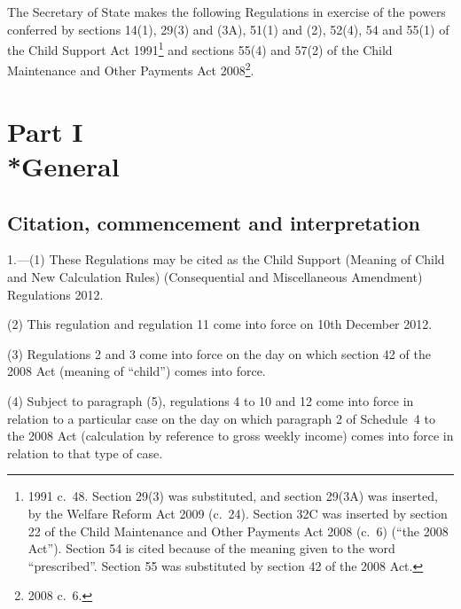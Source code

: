 \documentclass[12pt,a4paper]{article}
\title{\regstitle}
\author{S.I.\ 2012 No.\ 2785}
\date{Made
2nd November 2012\\
Laid before Parliament
8th November 2012\\
Coming into force
in accordance with regulation 1
}
\begin{document}
\maketitle

\enlargethispage{\baselineskip}

\noindent
The Secretary of State makes the following Regulations in exercise of the powers conferred by sections 14(1), 29(3) and (3A), 51(1) and (2), 52(4), 54 and 55(1) of the Child Support Act 1991\footnote{1991 c.~48. Section 29(3) was substituted, and section 29(3A) was inserted, by the Welfare Reform Act 2009 (c.~24). Section 32C was inserted by section 22 of the Child Maintenance and Other Payments Act 2008 (c.~6) (“the 2008 Act”). Section 54 is cited because of the meaning given to the word “prescribed”. Section 55 was substituted by section 42 of the 2008 Act.} and sections 55(4) and 57(2) of the Child Maintenance and Other Payments Act 2008\footnote{2008 c.~6.}. 

{\sloppy

\tableofcontents

}

\bigskip

\setcounter{secnumdepth}{-2}

\section[Part I --- General]{Part I\\*General}

\renewcommand\parthead{--- Part I}

\subsection[1. Citation, commencement and interpretation]{Citation, commencement and interpretation}

1.---(1)  These Regulations may be cited as the Child Support (Meaning of Child and New Calculation Rules) (Consequential and Miscellaneous Amendment) Regulations 2012.

(2) This regulation and regulation 11 come into force on 10th December 2012.

(3) Regulations 2 and 3 come into force on the day on which section 42 of the 2008 Act (meaning of “child”) comes into force.

(4) Subject to paragraph (5), regulations 4 to 10 and 12 come into force in relation to a particular case on the day on which paragraph 2 of Schedule~4 to the 2008 Act (calculation by reference to gross weekly income) comes into force in relation to that type of case.
\end{document}
